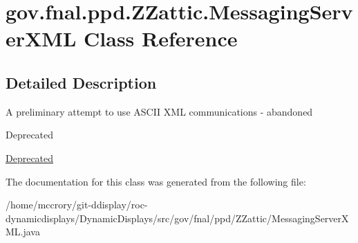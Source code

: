 \hypertarget{classgov_1_1fnal_1_1ppd_1_1ZZattic_1_1MessagingServerXML}{\section{gov.\-fnal.\-ppd.\-Z\-Zattic.\-Messaging\-Server\-X\-M\-L Class Reference}
\label{classgov_1_1fnal_1_1ppd_1_1ZZattic_1_1MessagingServerXML}
}


\subsection{Detailed Description}
A preliminary attempt to use A\-S\-C\-I\-I X\-M\-L communications -\/ abandoned \begin{DoxyRefDesc}{Deprecated}
\item[\hyperlink{deprecated__deprecated000022}{Deprecated}]\end{DoxyRefDesc}


The documentation for this class was generated from the following file\-:\begin{DoxyCompactItemize}
\item 
/home/mccrory/git-\/ddisplay/roc-\/dynamicdisplays/\-Dynamic\-Displays/src/gov/fnal/ppd/\-Z\-Zattic/Messaging\-Server\-X\-M\-L.\-java\end{DoxyCompactItemize}
